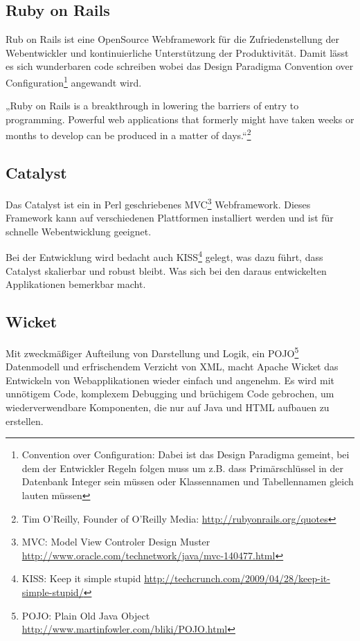 \subsection{Ruby on Rails}
Rub on Rails ist eine OpenSource Webframework für die Zufriedenstellung der
Webentwickler und kontinuierliche Unterstützung der Produktivität. Damit lässt
es sich wunderbaren code schreiben wobei das Design Paradigma Convention over
Configuration\footnote{Convention over Configuration: Dabei ist das Design
Paradigma gemeint, bei dem der Entwickler Regeln folgen muss um z.B. dass
Primärschlüssel in der Datenbank Integer sein müssen oder Klassennamen und
Tabellennamen gleich lauten müssen} angewandt wird.\cite{rubyonrails}

„Ruby on Rails is a breakthrough in lowering the barriers of entry to
programming. Powerful web applications that formerly might have taken weeks or 
months to develop can be produced in a matter of days.“\footnote{Tim O'Reilly,
Founder of O'Reilly Media: \url{http://rubyonrails.org/quotes} }

\subsection{Catalyst}
Das Catalyst ist ein in Perl geschriebenes  MVC\footnote{MVC: Model View
Controler Design Muster
\url{http://www.oracle.com/technetwork/java/mvc-140477.html}} Webframework. 
Dieses Framework kann auf verschiedenen Plattformen installiert werden und ist 
für schnelle Webentwicklung geeignet.\cite{catalystperlnet}

Bei der Entwicklung wird bedacht auch KISS\footnote{KISS: Keep it simple
stupid \url{http://techcrunch.com/2009/04/28/keep-it-simple-stupid/}} gelegt,
was dazu führt, dass Catalyst skalierbar und robust bleibt. Was sich bei den 
daraus entwickelten Applikationen bemerkbar macht.\cite{catalystframework}

\subsection{Wicket}
Mit zweckmäßiger Aufteilung von Darstellung und Logik, ein  POJO\footnote{POJO:
Plain Old Java Object \url{http://www.martinfowler.com/bliki/POJO.html}} 
Datenmodell und erfrischendem Verzicht von XML, macht Apache Wicket das 
Entwickeln von Webapplikationen wieder einfach und angenehm. Es wird mit 
unnötigem Code, komplexem Debugging und brüchigem Code gebrochen, um 
wiederverwendbare Komponenten, die nur auf Java und HTML aufbauen zu 
erstellen.\cite{wicket}

